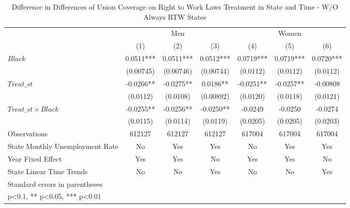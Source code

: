 \begin{table}[htbp]\centering
\def\sym#1{\ifmmode^{#1}\else\(^{#1}\)\fi}
\caption{Difference in Differences of Union Coverage on Right to Work Laws Treatment in State and Time - W/O Always RTW States}
\begin{tabular}{l*{6}{c}}
\hline\hline
                    &\multicolumn{3}{c}{Men}                        &\multicolumn{3}{c}{Women}                      \\\cmidrule(lr){2-4}\cmidrule(lr){5-7}
                    &\multicolumn{1}{c}{(1)}   &\multicolumn{1}{c}{(2)}   &\multicolumn{1}{c}{(3)}   &\multicolumn{1}{c}{(4)}   &\multicolumn{1}{c}{(5)}   &\multicolumn{1}{c}{(6)}   \\
\hline
$ Black $           &      0.0511***&      0.0511***&      0.0512***&      0.0719***&      0.0719***&      0.0720***\\
                    &   (0.00745)   &   (0.00746)   &   (0.00744)   &    (0.0112)   &    (0.0112)   &    (0.0112)   \\
[1em]
$ Treat\_{st} $      &     -0.0266** &     -0.0275** &      0.0186** &     -0.0251** &     -0.0257** &    -0.00808   \\
                    &    (0.0112)   &    (0.0108)   &   (0.00892)   &    (0.0120)   &    (0.0118)   &    (0.0121)   \\
[1em]
$ Treat\_{st} \times Black $&     -0.0255** &     -0.0256** &     -0.0250** &     -0.0249   &     -0.0250   &     -0.0274   \\
                    &    (0.0115)   &    (0.0114)   &    (0.0119)   &    (0.0205)   &    (0.0205)   &    (0.0203)   \\
\hline
Observations        &      612127   &      612127   &      612127   &      617004   &      617004   &      617004   \\
State Monthly Unemployment Rate&          No   &         Yes   &         Yes   &          No   &         Yes   &         Yes   \\
Year Fixed Effect   &         Yes   &         Yes   &          No   &         Yes   &         Yes   &          No   \\
State Linear Time Trends&          No   &          No   &         Yes   &          No   &          No   &         Yes   \\
\hline\hline
\multicolumn{7}{l}{\footnotesize Standard errors in parentheses}\\
\multicolumn{7}{l}{\footnotesize * p<0.1, ** p<0.05, *** p<0.01}\\
\end{tabular}
\end{table}
